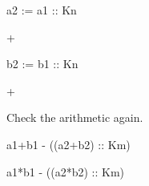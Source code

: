 {{{{{{{{{{{{{{{{{{\begin{xtc}
\begin{xtccomment}
\end{xtccomment}
\begin{spadsrc}
a2 := a1 :: Kn 
\end{spadsrc}
\begin{TeXOutput}
\begin{fricasmath}{14}
+%
\end{fricasmath}
\end{TeXOutput}
\end{xtc}
\begin{xtc}
\begin{xtccomment}
\end{xtccomment}
\begin{spadsrc}
b2 := b1 :: Kn 
\end{spadsrc}
\begin{TeXOutput}
\begin{fricasmath}{15}
+%
\end{fricasmath}
\end{TeXOutput}
\end{xtc}
%
\begin{xtc}
\begin{xtccomment}
Check the arithmetic again.
\end{xtccomment}
\begin{spadsrc}
a1+b1 - ((a2+b2) :: Km) 
\end{spadsrc}
\begin{TeXOutput}
\begin{fricasmath}{16}
%
\end{fricasmath}
\end{TeXOutput}
\end{xtc}
\begin{xtc}
\begin{xtccomment}
\end{xtccomment}
\begin{spadsrc}
a1*b1 - ((a2*b2) :: Km) 
\end{spadsrc}
\begin{TeXOutput}
\begin{fricasmath}{17}
%
\end{fricasmath}
\end{TeXOutput}
\end{xtc}

}}}}}}}}}}}}}}}}}}
